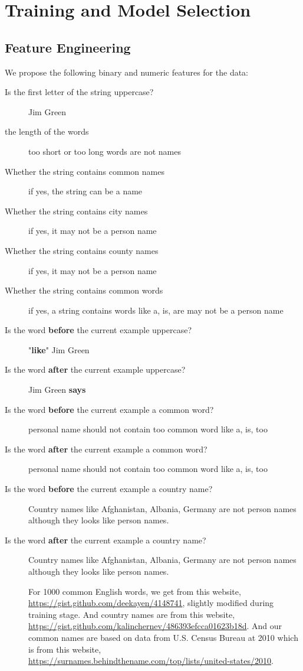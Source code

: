 \documentclass{article}
\begin{document}
\section{Training and Model Selection}

\subsection{ Feature Engineering}

We propose the following binary and numeric features for the  data:

\begin{description}
\item[Is the first letter of the string  uppercase?] Jim Green
\item[the length of the words] too short or too long words are not names
\item[Whether the string contains common names] if yes, the string can be a name
\item[Whether the string contains city names] if yes, it may not be a person name 
\item[Whether the string contains county names] if yes, it may not be a person name 
\item[Whether the string contains common words] if yes, a string contains words like a, is, are may not be a person name
\item[Is the word \textbf{before} the current example uppercase?]  "\textbf{like}" Jim Green 
\item[Is the word \textbf{after} the current example uppercase?] Jim Green \textbf{says}
\item[Is the word \textbf{before} the current example a common word?] personal name should not contain too common word like a, is, too
\item[Is the word \textbf{after} the current example a common word?] personal name should not contain too common word like a, is, too
\item[Is the word \textbf{before} the current example a country name?] Country names like Afghanistan, Albania, Germany are not person names although they looks like person names.
\item[Is the word \textbf{after} the current example a country name?] Country names like Afghanistan, Albania, Germany are not person names although they looks like person names.


For 1000 common English words, we get from this website, \url{https://gist.github.com/deekayen/4148741}, slightly modified during training stage. And country names are from this website, \url{https://gist.github.com/kalinchernev/486393efcca01623b18d}. And our common names are based on data from  U.S. Census Bureau at 2010 which is from this website, \url{https://surnames.behindthename.com/top/lists/united-states/2010}.


\end{description}
\end{document}
